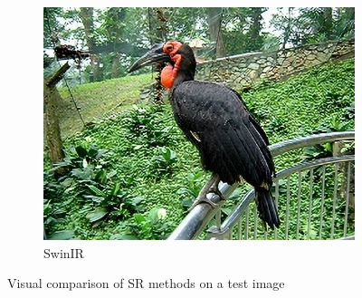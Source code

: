 \documentclass[10pt,twocolumn,letterpaper]{article}
\begin{document}
\begin{figure}[h]
\begin{subfigure}{0.18\textwidth}
        \includegraphics[width=1\linewidth]{000057-sw.jpg}
        \caption{SwinIR}
        \label{fig:subim5}
    \end{subfigure}
\caption{Visual comparison of SR methods on a test image}
\label{fig:comparison}
\end{figure}
\end{document}

